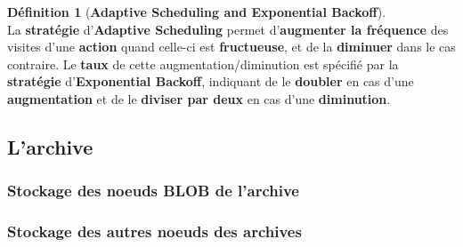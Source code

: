 \documentclass[12pt,a4paper]{report}
\theoremstyle{definition}
\newtheorem*{definition}{Définition}
\begin{document}
\begin{definition}[\textbf{Adaptive Scheduling and Exponential Backoff}]\mbox{}\\
La \textbf{stratégie} d'\textbf{Adaptive Scheduling} permet d'\textbf{augmenter la fréquence} des visites d'une \textbf{action} quand celle-ci est \textbf{fructueuse}, et de la \textbf{diminuer} dans le cas contraire. Le \textbf{taux} de cette augmentation/diminution est spécifié par la \textbf{stratégie} d'\textbf{Exponential Backoff}, indiquant de le \textbf{doubler} en cas d'une \textbf{augmentation} et de le \textbf{diviser par deux} en cas d'une \textbf{diminution}.
\end{definition}

\subsection{L'archive}

\subsubsection{Stockage des noeuds BLOB de l'archive}


\subsubsection{Stockage des autres noeuds des archives}
\end{document}
